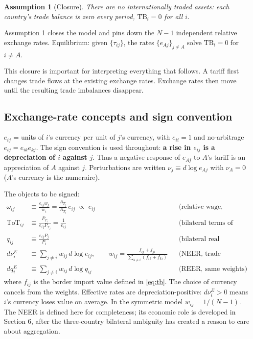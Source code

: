 \documentclass[11pt]{article}
\newtheorem{assumption}{Assumption}
\begin{document}
\begin{assumption}[Closure]
There are no internationally traded assets: each country's trade balance is zero every period,
$\mathrm{TB}_i = 0$ for all $i$.
\label{as:closure}
\end{assumption}
\noindent Assumption \ref{as:closure} closes the model and pins down the $N-1$ independent relative exchange rates. Equilibrium: given $\{\tau_{ij}\}$, the rates $\{e_{Aj}\}_{j\neq A}$ solve $\mathrm{TB}_i = 0$ for $i \neq A$.

This closure is important for interpreting everything that follows. A tariff first changes trade flows at the existing exchange rates. Exchange rates then move until the resulting trade imbalances disappear.

\subsection{Exchange-rate concepts and sign convention}

$e_{ij}$ = units of $i$'s currency per unit of $j$'s currency, with $e_{ii} = 1$ and no-arbitrage $e_{ij} = e_{ik}e_{kj}$. The sign convention is used throughout: \textbf{a rise in $e_{ij}$ is a depreciation of $i$ against $j$}. Thus a negative response of $e_{Aj}$ to $A$'s tariff is an appreciation of $A$ against $j$. Perturbations are written $\nu_j \equiv d\log e_{Aj}$ with $\nu_A = 0$ ($A$'s currency is the numeraire).

The objects to be signed:
\begin{align}
\omega_{ij} &\equiv \frac{e_{ij} w_j}{w_i} = \frac{A_{T_j}}{A_{T_i}}\, e_{ij} \;\propto\; e_{ij}
&& \text{(relative wage, common currency)}
\label{eq:relwage}\\[2pt]
\mathrm{ToT}_{ij} &\equiv \frac{P_{T_i}}{e_{ij} P_{T_j}} = \frac{1}{e_{ij}}
&& \text{(bilateral terms of trade, pre-tariff prices)}
\label{eq:tot}\\[2pt]
q_{ij} &\equiv \frac{e_{ij} P_j}{P_i}
&& \text{(bilateral real exchange rate)}
\label{eq:rer}\\[2pt]
d\nu_i^{E} &\equiv \sum_{j \neq i} w_{ij}\, d\log e_{ij},
\qquad
w_{ij} = \frac{f_{ij} + f_{ji}}{\sum_{k\neq i} (f_{ik} + f_{ki})}
&& \text{(NEER, trade weights)}
\label{eq:neer}\\[2pt]
d q_i^{E} &\equiv \sum_{j \neq i} w_{ij}\, d\log q_{ij}
&& \text{(REER, same weights)}
\label{eq:reer}
\end{align}
where $f_{ij}$ is the border import value defined in \eqref{eq:tb}. The choice of currency cancels from the weights. Effective rates are depreciation-positive: $d\nu_i^E > 0$ means $i$'s currency loses value on average. In the symmetric model $w_{ij} = 1/(N-1)$. The NEER is defined here for completeness; its economic role is developed in Section 6, after the three-country bilateral ambiguity has created a reason to care about aggregation.
\end{document}
